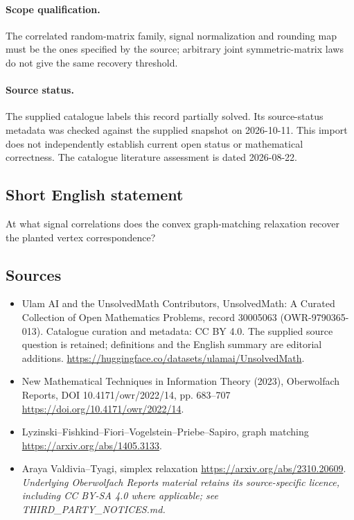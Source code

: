 \documentclass[11pt]{article}
\begin{document}
\paragraph{Scope qualification.}
The correlated random-matrix family, signal normalization and rounding map must be the ones specified by the source; arbitrary joint symmetric-matrix laws do not give the same recovery threshold.
\paragraph{Source status.}
The supplied catalogue labels this record partially solved. Its source-status metadata was checked against the supplied snapshot on 2026-10-11. This import does not independently establish current open status or mathematical correctness. The catalogue literature assessment is dated 2026-08-22.
\subsection{Short English statement}
At what signal correlations does the convex graph-matching relaxation recover the planted vertex correspondence?
\subsection{Sources}
\begin{itemize}
\item[S1] Ulam AI and the UnsolvedMath Contributors, UnsolvedMath: A Curated Collection of Open Mathematics Problems, record 30005063 (OWR-9790365-013). Catalogue curation and metadata: CC BY 4.0. The supplied source question is retained; definitions and the English summary are editorial additions.
\url{https://huggingface.co/datasets/ulamai/UnsolvedMath}.
\item[S2] New Mathematical Techniques in Information Theory (2023), Oberwolfach Reports, DOI 10.4171/owr/2022/14, pp. 683--707
\url{https://doi.org/10.4171/owr/2022/14}.
\item[S3] Lyzinski--Fishkind--Fiori--Vogelstein--Priebe--Sapiro, graph matching
\url{https://arxiv.org/abs/1405.3133}.
\item[S4] Araya Valdivia--Tyagi, simplex relaxation
\url{https://arxiv.org/abs/2310.20609}.
\textit{Underlying Oberwolfach Reports material retains its source-specific licence, including CC BY-SA 4.0 where applicable; see THIRD\_PARTY\_NOTICES.md.}
\end{itemize}
\end{document}
